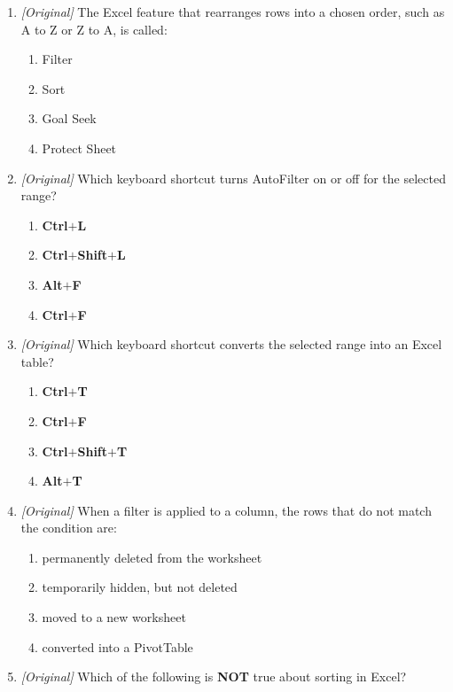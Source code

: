 \begin{enumerate}[label=\textbf{Q\arabic*.}, leftmargin=*]
\item \textit{[Original]} The Excel feature that rearranges rows into a chosen
  order, such as A to Z or Z to A, is called:
  \begin{enumerate}[label=\Alph*.]
    \item Filter
    \item Sort
    \item Goal Seek
    \item Protect Sheet
  \end{enumerate}
\item \textit{[Original]} Which keyboard shortcut turns AutoFilter on or off for
  the selected range?
  \begin{enumerate}[label=\Alph*.]
    \item \textbf{Ctrl}$+$\textbf{L}
    \item \textbf{Ctrl}$+$\textbf{Shift}$+$\textbf{L}
    \item \textbf{Alt}$+$\textbf{F}
    \item \textbf{Ctrl}$+$\textbf{F}
  \end{enumerate}
\item \textit{[Original]} Which keyboard shortcut converts the selected range
  into an Excel table?
  \begin{enumerate}[label=\Alph*.]
    \item \textbf{Ctrl}$+$\textbf{T}
    \item \textbf{Ctrl}$+$\textbf{F}
    \item \textbf{Ctrl}$+$\textbf{Shift}$+$\textbf{T}
    \item \textbf{Alt}$+$\textbf{T}
  \end{enumerate}
\item \textit{[Original]} When a filter is applied to a column, the rows that do
  not match the condition are:
  \begin{enumerate}[label=\Alph*.]
    \item permanently deleted from the worksheet
    \item temporarily hidden, but not deleted
    \item moved to a new worksheet
    \item converted into a PivotTable
  \end{enumerate}
\item \textit{[Original]} Which of the following is \textbf{NOT} true about
  sorting in Excel?
  \begin{enumerate}[label=\Alph*.]

\end{enumerate}
\end{enumerate}
